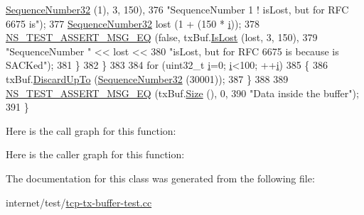 \begin{DoxyCode}
      \hyperlink{classns3_1_1SequenceNumber}{SequenceNumber32} (1), 3, 150),
376                                  \textcolor{stringliteral}{"SequenceNumber 1 ! isLost, but for RFC 6675 is"});
377           \hyperlink{classns3_1_1SequenceNumber}{SequenceNumber32} lost (1 + (150 * \hyperlink{bernuolliDistribution_8m_a6f6ccfcf58b31cb6412107d9d5281426}{i}));
378           \hyperlink{group__testing_ga2a9d78cffb3db8e867c35fff0b698cf5}{NS\_TEST\_ASSERT\_MSG\_EQ} (\textcolor{keyword}{false}, txBuf.\hyperlink{classns3_1_1TcpTxBuffer_add55043ebbafc30ba4e48d3f8aa9f064}{IsLost} (lost, 3, 150),
379                                  \textcolor{stringliteral}{"SequenceNumber "} << lost <<
380                                  \textcolor{stringliteral}{"isLost, but for RFC 6675 is because is SACKed"});
381         \}
382     \}
383 
384   \textcolor{keywordflow}{for} (uint32\_t \hyperlink{bernuolliDistribution_8m_a6f6ccfcf58b31cb6412107d9d5281426}{i}=0; \hyperlink{bernuolliDistribution_8m_a6f6ccfcf58b31cb6412107d9d5281426}{i}<100; ++\hyperlink{bernuolliDistribution_8m_a6f6ccfcf58b31cb6412107d9d5281426}{i})
385     \{
386       txBuf.\hyperlink{classns3_1_1TcpTxBuffer_ad145a6de0122b3400fcbbff030d2acea}{DiscardUpTo} (\hyperlink{classns3_1_1SequenceNumber}{SequenceNumber32} (30001));
387     \}
388 
389   \hyperlink{group__testing_ga2a9d78cffb3db8e867c35fff0b698cf5}{NS\_TEST\_ASSERT\_MSG\_EQ} (txBuf.\hyperlink{classns3_1_1TcpTxBuffer_a24621b9d6f583bbbe4567b239901176b}{Size} (), 0,
390                          \textcolor{stringliteral}{"Data inside the buffer"});
391 \}
\end{DoxyCode}


Here is the call graph for this function\+:




Here is the caller graph for this function\+:




The documentation for this class was generated from the following file\+:\begin{DoxyCompactItemize}
\item 
internet/test/\hyperlink{tcp-tx-buffer-test_8cc}{tcp-\/tx-\/buffer-\/test.\+cc}\end{DoxyCompactItemize}
